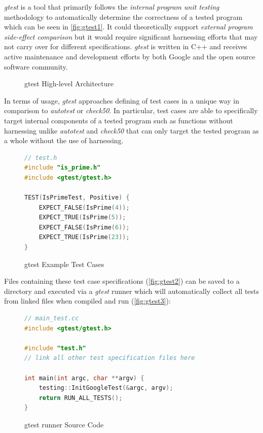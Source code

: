 \documentclass[hidelinks, 12pt]{extreport}
\begin{document}
\textit{gtest} is a tool that primarily follows the \textit{internal program unit testing} methodology to automatically determine the correctness of a tested program which can be seen in \autoref{fig:gtest1}. It could theoretically support \textit{external program side-effect comparison} but it would require significant harnessing efforts that may not carry over for different specifications. \textit{gtest} is written in C++ and receives active maintenance and development efforts by both Google and the open source software community.

\begin{figure}[h]
	\centering
	\caption{gtest High-level Architecture}
	\label{fig:gtest1}
\end{figure}

In terms of usage, \textit{gtest} approaches defining of test cases in a unique way in comparison to \textit{autotest} or \textit{check50}. In particular, test cases are able to specifically target internal components of a tested program such as functions without harnessing unlike \textit{autotest} and \textit{check50} that can only target the tested program as a whole without the use of harnessing.

\begin{figure}[h]
	\centering
	\begin{lstlisting}[language=c++, breaklines=true, linewidth=\linewidth]
// test.h
#include "is_prime.h"
#include <gtest/gtest.h>

TEST(IsPrimeTest, Positive) {
	EXPECT_FALSE(IsPrime(4));
	EXPECT_TRUE(IsPrime(5));
	EXPECT_FALSE(IsPrime(6));
	EXPECT_TRUE(IsPrime(23));
}
	\end{lstlisting}
	\caption{gtest Example Test Cases}
	\label{fig:gtest2}
\end{figure}

Files containing these test case specifications (\autoref{fig:gtest2}) can be saved to a directory and executed via a \textit{gtest} runner which will automatically collect all tests from linked files when compiled and run (\autoref{fig:gtest3}):

\begin{figure}[h]
	\centering
	\begin{lstlisting}[language=c++, breaklines=true, linewidth=\linewidth]
// main_test.cc
#include <gtest/gtest.h>

#include "test.h"
// link all other test specification files here

int main(int argc, char **argv) {
	testing::InitGoogleTest(&argc, argv);
	return RUN_ALL_TESTS();
}
	\end{lstlisting}
	\caption{gtest runner Source Code}
	\label{fig:gtest3}
\end{figure}
\end{document}
